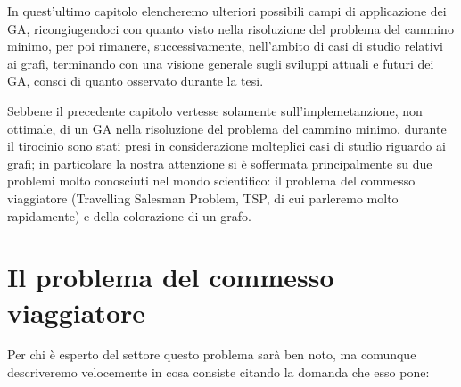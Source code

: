 
In quest'ultimo capitolo elencheremo ulteriori possibili campi di applicazione dei GA, ricongiugendoci con quanto visto nella risoluzione del problema del cammino minimo, per poi rimanere, successivamente, nell'ambito di casi di studio relativi ai grafi, terminando con una visione generale sugli sviluppi attuali e futuri dei GA, consci di quanto osservato durante la tesi.

Sebbene il precedente capitolo vertesse solamente sull'implemetanzione, non ottimale, di un GA nella risoluzione del problema del cammino minimo, durante il tirocinio sono stati presi in considerazione molteplici casi di studio riguardo ai grafi; in particolare la nostra attenzione si \`e soffermata principalmente su due problemi molto conosciuti nel mondo scientifico: il problema del commesso viaggiatore \cite{tsp1} (Travelling Salesman Problem, TSP, di cui parleremo molto rapidamente) e della colorazione di un grafo\cite{graphcol6}.
\section{Il problema del commesso viaggiatore}
Per chi \`e esperto del settore questo problema sar\`a ben noto, ma comunque descriveremo velocemente in cosa consiste citando la domanda che esso pone:
\vspace{3mm}

